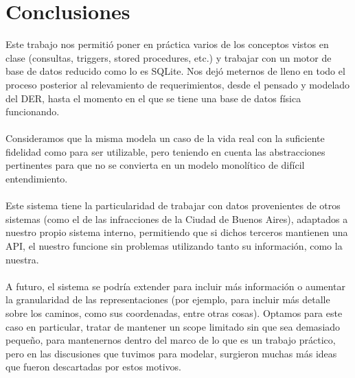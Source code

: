 \section{Conclusiones}
Este trabajo nos permitió poner en práctica varios de los conceptos vistos en clase (consultas, triggers, stored procedures, etc.) y trabajar con un motor de base de datos reducido como lo es SQLite. Nos dejó meternos de lleno en todo el proceso posterior al relevamiento de requerimientos, desde el pensado y modelado del DER, hasta el momento en el que se tiene una base de datos física funcionando.\\
\\
Consideramos que la misma modela un caso de la vida real con la suficiente fidelidad como para ser utilizable, pero teniendo en cuenta las abstracciones pertinentes para que no se convierta en un modelo monolítico de difícil entendimiento.\\
\\
Este sistema tiene la particularidad de trabajar con datos provenientes de otros sistemas (como el de las infracciones de la Ciudad de Buenos Aires), adaptados a nuestro propio sistema interno, permitiendo que si dichos terceros mantienen una API, el nuestro funcione sin problemas utilizando tanto su información, como la nuestra.\\
\\
A futuro, el sistema se podría extender para incluir más información o aumentar la granularidad de las representaciones (por ejemplo, para incluir más detalle sobre los caminos, como sus coordenadas, entre otras cosas). Optamos para este caso en particular, tratar de mantener un scope limitado sin que sea demasiado pequeño, para mantenernos dentro del marco de lo que es un trabajo práctico, pero en las discusiones que tuvimos para modelar, surgieron muchas más ideas que fueron descartadas por estos motivos.